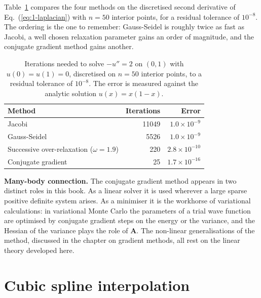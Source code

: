 Table~\ref{tab:iterative} compares the four methods on the discretised second
derivative of Eq.~(\ref{eq:1-laplacian}) with $n=50$ interior points, for a
residual tolerance of $10^{-8}$.  The ordering is the one to remember:
Gauss-Seidel is roughly twice as fast as Jacobi, a well chosen relaxation
parameter gains an order of magnitude, and the conjugate gradient method gains
another.

\begin{table}[h]
\centering
\renewcommand{\arraystretch}{1.25}
\setlength{\tabcolsep}{10pt}
\begin{tabular}{lrr}
\toprule
\textbf{Method} & \textbf{Iterations} & \textbf{Error} \\
\midrule
Jacobi                       & 11049 & $1.0\times10^{-9}$ \\
Gauss-Seidel                 &  5526 & $1.0\times10^{-9}$ \\
Successive over-relaxation ($\omega=1.9$) & 220 & $2.8\times10^{-10}$ \\
Conjugate gradient           &    25 & $1.7\times10^{-16}$ \\
\bottomrule
\end{tabular}
\caption{Iterations needed to solve $-u''=2$ on $(0,1)$ with $u(0)=u(1)=0$,
discretised on $n=50$ interior points, to a residual tolerance of $10^{-8}$.
The error is measured against the analytic solution $u(x)=x(1-x)$.}
\label{tab:iterative}
\end{table}

\begin{notebox}
\textbf{Many-body connection.} The conjugate gradient method appears in two
distinct roles in this book.  As a linear solver it is used wherever a large
sparse positive definite system arises.  As a minimiser it is the workhorse of
variational calculations: in variational Monte Carlo the parameters of a trial
wave function are optimised by conjugate gradient steps on the energy or the
variance, and the Hessian of the variance plays the role of $\bm{A}$.  The
non-linear generalisations of the method, discussed in the chapter on
gradient methods, all rest on the linear theory developed here.
\end{notebox}

\section{Cubic spline interpolation}
\label{sec:spline}

